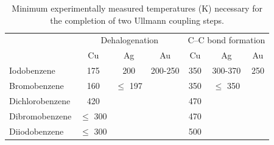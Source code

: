 \documentclass[aps,prl,reprint,amsmath,amssymb,floatfix,notitlepage]{revtex4-1}
\begin{document}
\begin{table}
\centering\caption{Minimum experimentally measured temperatures (\si{\kelvin}) necessary for the completion of two Ullmann coupling steps.}
\begin{tabular}{ lcccccc }
 \hline
 \hline
  & \multicolumn{3}{c}{Dehalogenation} & \multicolumn{3}{c}{C--C bond formation} \\
  &\multicolumn{1}{c}{Cu} &\multicolumn{1}{c}{Ag} & \multicolumn{1}{c}{Au} & \multicolumn{1}{c}{Cu} &\multicolumn{1}{c}{Ag} &\multicolumn{1}{c}{Au}\\
 \hline
 Iodobenzene             &175\cite{sur_sci01} &200\cite{sur_sci02} &200-250\cite{sur_sci03} &350\cite{ullmann_68} &300-370\cite{ullmann_68} &250\cite{sur_sci03}\\
 Bromobenzene  &160\cite{ullmann_67} &$\leq$ 197\cite{sur_sci02}  &  &350\cite{ullmann_67}  &$\leq$ 350\cite{sur_sci02}  & \\
 Dichlorobenzene &420\cite{ullmann_52} & & &470\cite{ullmann_52} & & \\
 Dibromobenzene &$\leq$ 300\cite{ullmann_52} & & &470\cite{ullmann_98}  & & \\
 Diiodobenzene &$\leq$ 300\cite{ullmann_52} & & &500 \cite{ullmann_88} & & \\
 \hline
 \hline
\end{tabular}
\label{table:experimental-temperatures}
\end{table}
\end{document}
